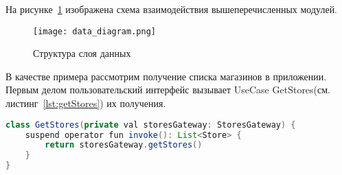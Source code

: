 На рисунке~\ref{fig:arch:data_diagram} изображена схема взаимодействия вышеперечисленных модулей.
 
\begin{figure}[H]
 \centering
   \texttt{[image: data\_diagram.png]} 
   \caption{Структура слоя данных}
   \label{fig:arch:data_diagram}
\end{figure}
 
В качестве примера рассмотрим получение списка магазинов в приложении. Первым делом пользовательский интерфейс вызывает UseCase GetStores(см. листинг~\ref{lst:getStores}) их получения.

\begin{lstlisting}[language=Java,label={lst:getStores},caption={UseCase GetStores}]
class GetStores(private val storesGateway: StoresGateway) {
    suspend operator fun invoke(): List<Store> {
        return storesGateway.getStores()
    }
}
\end{lstlisting}

